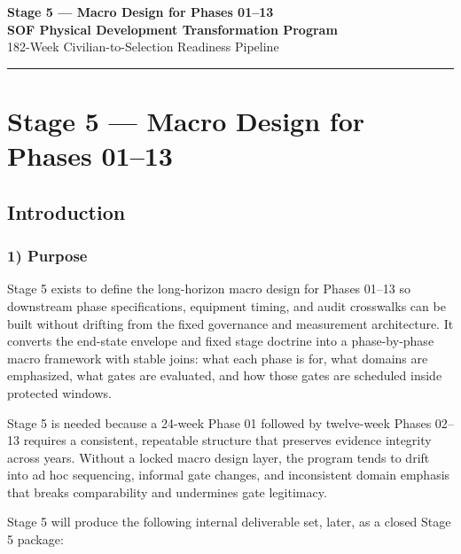 \documentclass[10pt]{article}
\newcommand{\TitleLine}{\textcolor{StageBlue}{\rule{0.98\linewidth}{0.95pt}}}
\begin{document}
\begin{tcolorbox}
\begin{center}
{\LARGE\bfseries Stage 5 — Macro Design for Phases 01–13}\\[0.35em]
{\Large\bfseries SOF Physical Development Transformation Program}\\[0.25em]
{\large 182-Week Civilian-to-Selection Readiness Pipeline}\\[0.65em]
\TitleLine
\end{center}
\end{tcolorbox}

\vspace{0.35em}

\section*{Stage 5 — Macro Design for Phases 01–13}
{}

\subsection*{Introduction}
{}

\subsubsection*{1) Purpose}

Stage 5 exists to define the long-horizon macro design for Phases 01–13 so downstream phase specifications, equipment timing, and audit crosswalks can be built without drifting from the fixed governance and measurement architecture. It converts the end-state envelope and fixed stage doctrine into a phase-by-phase macro framework with stable joins: what each phase is for, what domains are emphasized, what gates are evaluated, and how those gates are scheduled inside protected windows.

Stage 5 is needed because a 24-week Phase 01 followed by twelve-week Phases 02–13 requires a consistent, repeatable structure that preserves evidence integrity across years. Without a locked macro design layer, the program tends to drift into ad hoc sequencing, informal gate changes, and inconsistent domain emphasis that breaks comparability and undermines gate legitimacy.

Stage 5 will produce the following internal deliverable set, later, as a closed Stage 5 package:
\end{document}
